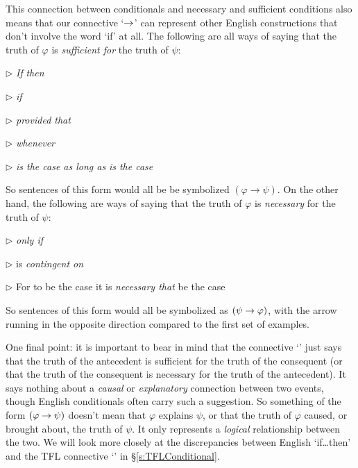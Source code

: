 This connection between conditionals and necessary and sufficient conditions also means that our connective `$\rightarrow$' can represent other English constructions that don't involve the word `if' at all.  The following are all ways of saying that the truth of $\varphi$ is \emph{sufficient for} the truth of $\psi$:
\begin{earg}

\item[$\rhd$] \emph{If} \meta{\varphi} \emph{then} \meta{\psi}


 \item[$\rhd$] \meta{\psi} \emph{if} \meta{\varphi}

 \item[$\rhd$] \meta{\psi} \emph{provided that} \meta{\varphi}

 \item[$\rhd$] \meta{\psi} \emph{whenever} \meta{\varphi} 


 \item[$\rhd$] \meta{\psi} \emph{is the case as long as} \meta{\varphi} \emph{is the case}
\end{earg}
So sentences of this form would all be be symbolized $(\varphi \rightarrow \psi)$.  On the other hand, the following are ways of saying that the truth of $\varphi$ is \emph{necessary} for the truth of $\psi$:
\begin{earg}

\item[$\rhd$] \meta{\psi} \emph{only if} \meta{\varphi}


 \item[$\rhd$] \meta{\psi} is \emph{contingent on} \meta{\varphi}
 
  \item[$\rhd$] For \meta{\psi} to be the case it is \emph{necessary that} \meta{\varphi} be the case
\end{earg}
So sentences of this form would all be symbolized as $(\psi \rightarrow \varphi)$, with the arrow running in the opposite direction compared to the first set of examples.

One final point: it is important to bear in mind that the connective `\eif' just says that the truth of the antecedent is sufficient for the truth of the consequent (or that the truth of the consequent is necessary for the truth of the antecedent). It says nothing about a \emph{causal} or \emph{explanatory} connection between two events, though English conditionals often carry such a suggestion.  So something of the form $(\varphi \rightarrow \psi)$ doesn't mean that $\varphi$ explains $\psi$, or that the truth of $\varphi$ caused, or brought about, the truth of $\psi$. It only represents a \emph{logical} relationship between the two.  We will look more closely at the discrepancies between English `if\ldots then' and the TFL connective `\eif' in \S\ref{s:TFLConditional}.


